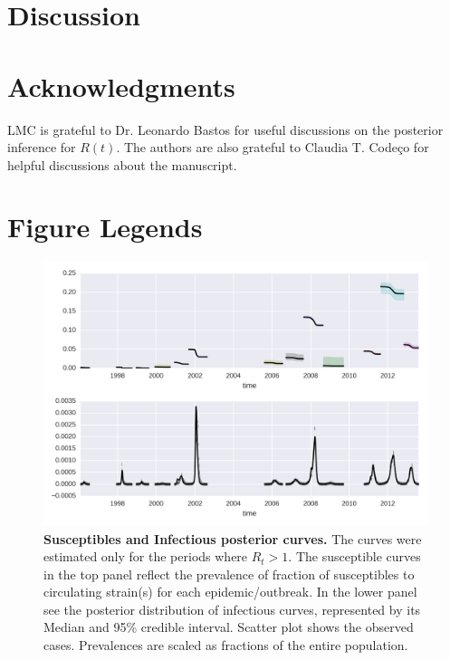 \section*{Discussion}
\section*{Acknowledgments}
LMC is grateful to Dr. Leonardo Bastos for useful discussions on the 
posterior inference for $R(t)$. The authors are also grateful to Claudia T. 
Codeço for helpful discussions about the manuscript.


\section*{Figure Legends}
%
\begin{figure}
\begin{center}
\includegraphics[width=.9\textwidth]{./concat_SI.png}
\end{center}
\caption{
{\bf Susceptibles and Infectious posterior curves.}  The curves were estimated 
only for the periods where $R_t> 1$.  The susceptible curves in the top panel 
reflect the prevalence of fraction of susceptibles to circulating strain(s) for 
each epidemic/outbreak. In the lower panel see the posterior distribution 
of infectious curves, represented by its Median and 95\% credible interval. 
Scatter plot shows the observed cases. Prevalences are scaled as fractions 
of the entire population.
}
\label{Fig:S0}
\end{figure}



